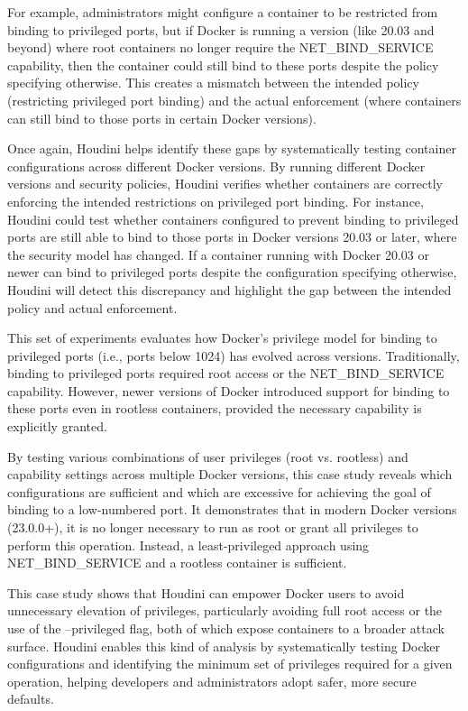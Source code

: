 \documentclass[12pt]{report}
\begin{document}
\begin{doublespace}
For example, administrators might configure a container to be restricted from binding to privileged ports, but if Docker is running a version (like 20.03 and beyond) where root containers no longer require the NET\_BIND\_SERVICE capability, then the container could still bind to these ports despite the policy specifying otherwise. This creates a mismatch between the intended policy (restricting privileged port binding) and the actual enforcement (where containers can still bind to those ports in certain Docker versions).

Once again, Houdini helps identify these gaps by systematically testing container configurations across different Docker versions. By running different Docker versions and security policies, Houdini verifies whether containers are correctly enforcing the intended restrictions on privileged port binding. For instance, Houdini could test whether containers configured to prevent binding to privileged ports are still able to bind to those ports in Docker versions 20.03 or later, where the security model has changed. If a container running with Docker 20.03 or newer can bind to privileged ports despite the configuration specifying otherwise, Houdini will detect this discrepancy and highlight the gap between the intended policy and actual enforcement.

This set of experiments evaluates how Docker's privilege model for binding to privileged ports (i.e., ports below 1024) has evolved across versions. Traditionally, binding to privileged ports required root access or the NET\_BIND\_SERVICE capability. However, newer versions of Docker introduced support for binding to these ports even in rootless containers, provided the necessary capability is explicitly granted.

By testing various combinations of user privileges (root vs. rootless) and capability settings across multiple Docker versions, this case study reveals which configurations are sufficient and which are excessive for achieving the goal of binding to a low-numbered port. It demonstrates that in modern Docker versions (23.0.0+), it is no longer necessary to run as root or grant all privileges to perform this operation. Instead, a least-privileged approach using NET\_BIND\_SERVICE and a rootless container is sufficient.

This case study shows that Houdini can empower Docker users to avoid unnecessary elevation of privileges, particularly avoiding full root access or the use of the --privileged flag, both of which expose containers to a broader attack surface. Houdini enables this kind of analysis by systematically testing Docker configurations and identifying the minimum set of privileges required for a given operation, helping developers and administrators adopt safer, more secure defaults.


\end{doublespace}
\end{document}
